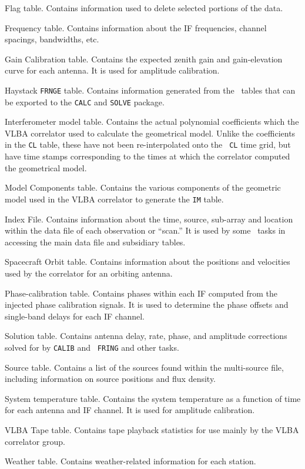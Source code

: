 \item[ FG ]{Flag table. Contains information used to delete selected
      portions of the data.}
\item[ FQ ]{Frequency table. Contains information about the IF
      frequencies, channel spacings, bandwidths, etc.}
\item[ GC ]{Gain Calibration table. Contains the expected zenith
      gain and gain-elevation curve for each antenna. It is used for
      amplitude calibration.}
\item[ HF ]{Haystack {\tt FRNGE} table. Contains information
       generated from the \AIPS\ tables that can be exported to the
       {\tt CALC} and {\tt SOLVE} package.}
\item[ IM ]{Interferometer model table. Contains the actual
      polynomial coefficients which the VLBA correlator used to
      calculate the geometrical model.  Unlike the coefficients in the
      {\tt CL} table, these have not been re-interpolated onto the {\tt
      CL} time grid, but have time stamps corresponding to the times
      at which the correlator computed the geometrical model.}
\item[ MC ]{Model Components table. Contains the various components
       of the geometric model used in the VLBA correlator to generate
       the {\tt IM} table.}
\item[ NX ]{Index File. Contains information about the time, source,
      sub-array and location within the data file of each observation
      or ``scan.''  It is used by some \AIPS\ tasks in accessing the
      main data file and subsidiary tables.}
\item[ OB ]{Spacecraft Orbit table.  Contains information about the
      positions and velocities used by the correlator for an orbiting
      antenna.}
\item[ PC ]{Phase-calibration table. Contains phases within each
      IF computed from the injected phase calibration signals.  It is
      used to determine the phase offsets and single-band delays for
      each IF channel.}
\item[ SN ]{Solution table.  Contains antenna delay, rate, phase, and
      amplitude corrections solved for by {\tt CALIB} and {\tt
      FRING} and other tasks.}
\item[ SU ]{Source table. Contains a list of the sources found
      within the multi-source file, including information on
      source positions and flux density.}
\item[ TY ]{System temperature table. Contains the system temperature
      as a function of time for each antenna and IF channel. It is
      used for amplitude calibration.}
\item[ VT ]{VLBA Tape table. Contains tape playback statistics for
       use mainly by the VLBA correlator group.}
\item[ WX ]{Weather table. Contains weather-related information for
       each station.}
\eeddes
{}

